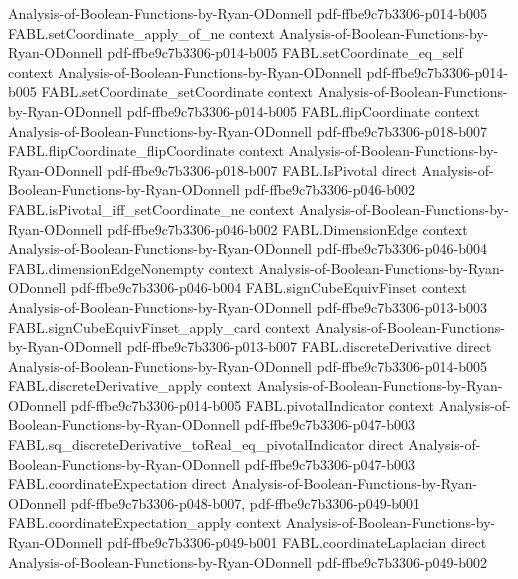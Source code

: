 \begin{theorem}
  {Analysis-of-Boolean-Functions-by-Ryan-ODonnell}
  {pdf-ffbe9c7b3306-p014-b005}
\proofstep
  {FABL.setCoordinate_apply_of_ne}
  {context}
  {Analysis-of-Boolean-Functions-by-Ryan-ODonnell}
  {pdf-ffbe9c7b3306-p014-b005}
\proofstep
  {FABL.setCoordinate_eq_self}
  {context}
  {Analysis-of-Boolean-Functions-by-Ryan-ODonnell}
  {pdf-ffbe9c7b3306-p014-b005}
\proofstep
  {FABL.setCoordinate_setCoordinate}
  {context}
  {Analysis-of-Boolean-Functions-by-Ryan-ODonnell}
  {pdf-ffbe9c7b3306-p014-b005}
\proofstep
  {FABL.flipCoordinate}
  {context}
  {Analysis-of-Boolean-Functions-by-Ryan-ODonnell}
  {pdf-ffbe9c7b3306-p018-b007}
\proofstep
  {FABL.flipCoordinate_flipCoordinate}
  {context}
  {Analysis-of-Boolean-Functions-by-Ryan-ODonnell}
  {pdf-ffbe9c7b3306-p018-b007}
\proofstep
  {FABL.IsPivotal}
  {direct}
  {Analysis-of-Boolean-Functions-by-Ryan-ODonnell}
  {pdf-ffbe9c7b3306-p046-b002}
\proofstep
  {FABL.isPivotal_iff_setCoordinate_ne}
  {context}
  {Analysis-of-Boolean-Functions-by-Ryan-ODonnell}
  {pdf-ffbe9c7b3306-p046-b002}
\proofstep
  {FABL.DimensionEdge}
  {context}
  {Analysis-of-Boolean-Functions-by-Ryan-ODonnell}
  {pdf-ffbe9c7b3306-p046-b004}
\proofstep
  {FABL.dimensionEdgeNonempty}
  {context}
  {Analysis-of-Boolean-Functions-by-Ryan-ODonnell}
  {pdf-ffbe9c7b3306-p046-b004}
\proofstep
  {FABL.signCubeEquivFinset}
  {context}
  {Analysis-of-Boolean-Functions-by-Ryan-ODonnell}
  {pdf-ffbe9c7b3306-p013-b003}
\proofstep
  {FABL.signCubeEquivFinset_apply_card}
  {context}
  {Analysis-of-Boolean-Functions-by-Ryan-ODonnell}
  {pdf-ffbe9c7b3306-p013-b007}
\proofstep
  {FABL.discreteDerivative}
  {direct}
  {Analysis-of-Boolean-Functions-by-Ryan-ODonnell}
  {pdf-ffbe9c7b3306-p014-b005}
\proofstep
  {FABL.discreteDerivative_apply}
  {context}
  {Analysis-of-Boolean-Functions-by-Ryan-ODonnell}
  {pdf-ffbe9c7b3306-p014-b005}
\proofstep
  {FABL.pivotalIndicator}
  {context}
  {Analysis-of-Boolean-Functions-by-Ryan-ODonnell}
  {pdf-ffbe9c7b3306-p047-b003}
\proofstep
  {FABL.sq_discreteDerivative_toReal_eq_pivotalIndicator}
  {direct}
  {Analysis-of-Boolean-Functions-by-Ryan-ODonnell}
  {pdf-ffbe9c7b3306-p047-b003}
\proofstep
  {FABL.coordinateExpectation}
  {direct}
  {Analysis-of-Boolean-Functions-by-Ryan-ODonnell}
  {pdf-ffbe9c7b3306-p048-b007,
    pdf-ffbe9c7b3306-p049-b001}
\proofstep
  {FABL.coordinateExpectation_apply}
  {context}
  {Analysis-of-Boolean-Functions-by-Ryan-ODonnell}
  {pdf-ffbe9c7b3306-p049-b001}
\proofstep
  {FABL.coordinateLaplacian}
  {direct}
  {Analysis-of-Boolean-Functions-by-Ryan-ODonnell}
  {pdf-ffbe9c7b3306-p049-b002}
\proofstep

\end{theorem}
